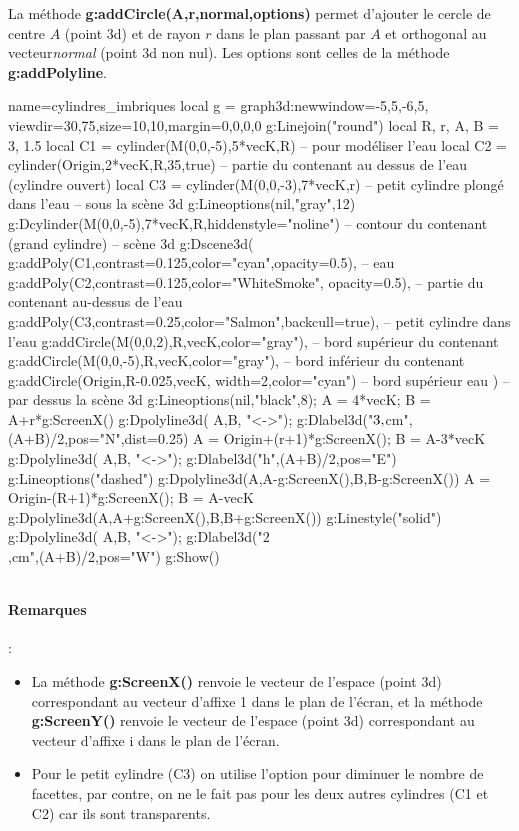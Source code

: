 \documentclass[%
10pt,%
a4paper,%
french,%
]%
{article}%
\newenvironment*{demo}[2][]{%
\gdef\legende{#2}%
\gdef\lab{#1}%
\bgroup
\VerbatimOut{\jobname.tmp}%
}%
{%
\endVerbatimOut%
\egroup%
\inputminted[ignorelexererrors=true,breaklines,bgcolor=Beige,linenos,numbersep=6pt,frame=single,fontsize=\footnotesize]{Lua}{\jobname.tmp}%
\begin{minipage}{0.9\textwidth}
\begin{center}
\captionof{figure}{\legende}\label{\lab}%
%
\end{center}
\end{minipage}
}
\begin{document}
La méthode \textbf{g:addCircle(A,r,normal,options)} permet d'ajouter le cercle de centre $A$ (point 3d) et de rayon $r$ dans le plan passant par $A$ et orthogonal au vecteur\emph{normal} (point 3d non nul). Les options sont celles de la méthode \textbf{g:addPolyline}.

\begin{demo}{Cylindre plein plongé dans de l'eau}
\begin{luadraw}{name=cylindres_imbriques}
local g = graph3d:new{window={-5,5,-6,5}, viewdir={30,75},size={10,10},margin={0,0,0,0}}
g:Linejoin("round")
local R, r, A, B = 3, 1.5
local C1 = cylinder(M(0,0,-5),5*vecK,R)  -- pour modéliser l'eau
local C2 = cylinder(Origin,2*vecK,R,35,true) -- partie du contenant au dessus de l'eau (cylindre ouvert)
local C3 = cylinder(M(0,0,-3),7*vecK,r) -- petit cylindre plongé dans l'eau
-- sous la scène 3d
g:Lineoptions(nil,"gray",12)
g:Dcylinder(M(0,0,-5),7*vecK,R,{hiddenstyle="noline"}) -- contour du contenant (grand cylindre)
-- scène 3d
g:Dscene3d(
        g:addPoly(C1,{contrast=0.125,color="cyan",opacity=0.5}), -- eau
        g:addPoly(C2,{contrast=0.125,color="WhiteSmoke", opacity=0.5}), -- partie du contenant au-dessus de l'eau
        g:addPoly(C3,{contrast=0.25,color="Salmon",backcull=true}), -- petit cylindre dans l'eau
        g:addCircle(M(0,0,2),R,vecK,{color="gray"}), -- bord supérieur du contenant
        g:addCircle(M(0,0,-5),R,vecK,{color="gray"}), -- bord inférieur du contenant        
        g:addCircle(Origin,R-0.025,vecK, {width=2,color="cyan"}) -- bord supérieur eau
        )
-- par dessus la scène 3d
g:Lineoptions(nil,"black",8); A = 4*vecK; B = A+r*g:ScreenX()
g:Dpolyline3d( {A,B}, "<->"); g:Dlabel3d("$3\\,$cm",(A+B)/2,{pos="N",dist=0.25})
A = Origin+(r+1)*g:ScreenX(); B = A-3*vecK
g:Dpolyline3d( {A,B}, "<->"); g:Dlabel3d("h",(A+B)/2,{pos="E"})
g:Lineoptions("dashed")
g:Dpolyline3d({{A,A-g:ScreenX()},{B,B-g:ScreenX()}})
A = Origin-(R+1)*g:ScreenX(); B = A-vecK
g:Dpolyline3d({{A,A+g:ScreenX()},{B,B+g:ScreenX()}})
g:Linestyle("solid")
g:Dpolyline3d( {A,B}, "<->"); g:Dlabel3d("$2$\\,cm",(A+B)/2,{pos="W"})
g:Show()
\end{luadraw}
\end{demo}

\paragraph{Remarques} : 
\begin{itemize}
    \item La méthode \textbf{g:ScreenX()} renvoie le vecteur de l'espace (point 3d) correspondant au vecteur d'affixe 1 dans le plan de l'écran, et la méthode \textbf{g:ScreenY()} renvoie le vecteur de l'espace (point 3d) correspondant au vecteur d'affixe i dans le plan de l'écran.
    \item Pour le petit cylindre (C3) on utilise l'option  pour diminuer le nombre de facettes, par contre, on ne le fait pas pour les deux autres cylindres (C1 et C2) car ils sont transparents.
\end{itemize}
\end{document}
